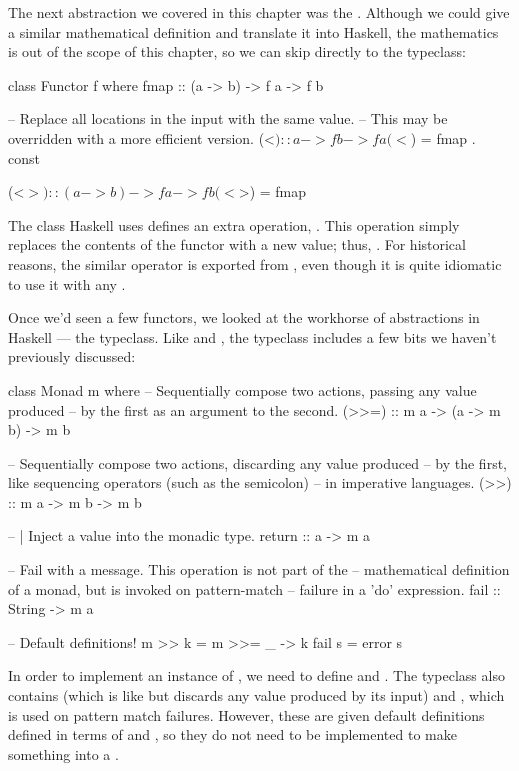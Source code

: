The next abstraction we covered in this chapter was the . Although we could give a
similar mathematical definition and translate it into Haskell, the mathematics is out of the scope
of this chapter, so we can skip directly to the typeclass:
\begin{haskell}
class  Functor f  where
  fmap        :: (a -> b) -> f a -> f b

  -- Replace all locations in the input with the same value.
  -- This may be overridden with a more efficient version.
  (<$)        :: a -> f b -> f a
  (<$)        =  fmap . const

(<$>) :: (a -> b) -> f a -> f b
(<$>) = fmap
\end{haskell}
The  class Haskell uses defines an extra operation, \inline{<\$}. This operation
simply replaces the contents of the functor with a new value; thus, .
For historical reasons, the similar operator \inline{<\$>} is exported from
, even though it is quite idiomatic to use it with any .

Once we'd seen a few functors, we looked at the workhorse of abstractions in Haskell --- the
 typeclass. Like  and , the  typeclass
includes a few bits we haven't previously discussed:
\begin{haskell}
class  Monad m  where
  -- Sequentially compose two actions, passing any value produced
  -- by the first as an argument to the second.
  (>>=)       :: m a -> (a -> m b) -> m b

  -- Sequentially compose two actions, discarding any value produced
  -- by the first, like sequencing operators (such as the semicolon)
  -- in imperative languages.
  (>>)        :: m a -> m b -> m b

  -- | Inject a value into the monadic type.
  return      :: a -> m a

  -- Fail with a message.  This operation is not part of the
  -- mathematical definition of a monad, but is invoked on pattern-match
  -- failure in a 'do' expression.
  fail        :: String -> m a

  -- Default definitions!
  m >> k      = m >>= \_ -> k
  fail s      = error s
\end{haskell}
In order to implement an instance of , we need to define \inline{>>=} and
. The typeclass also contains \inline{>>} (which is like \inline{>>=} but discards
any value produced by its input) and , which is used on pattern match failures.
However, these are given default definitions defined in terms of \inline{>>=} and , so
they do not need to be implemented to make something into a .

